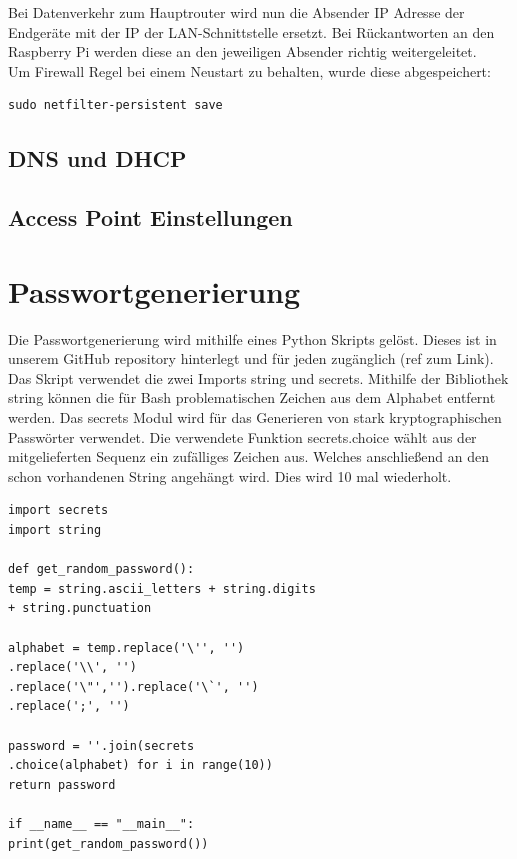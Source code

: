 \documentclass[a4paper,11pt,singlespacing]{article}
\begin{document}
                Bei Datenverkehr zum Hauptrouter wird nun die Absender IP Adresse der Endgeräte mit der IP der LAN-Schnittstelle ersetzt. Bei Rückantworten an den Raspberry Pi werden diese an den jeweiligen Absender richtig weitergeleitet.\\
            
                Um  Firewall Regel bei einem Neustart zu behalten, wurde diese abgespeichert:\\
                
            \begin{lstlisting}
sudo netfilter-persistent save
         \end{lstlisting}    
            \subsection{DNS und DHCP}
            \subsection{Access Point Einstellungen}
         
            
    	\section{Passwortgenerierung}
    		Die Passwortgenerierung wird mithilfe eines Python Skripts gelöst. Dieses ist in unserem GitHub repository hinterlegt und für jeden zugänglich (ref zum Link). Das Skript verwendet die zwei Imports string und secrets. Mithilfe der Bibliothek string können die für Bash problematischen Zeichen aus dem Alphabet entfernt werden. Das secrets Modul wird für das Generieren von stark kryptographischen Passwörter verwendet. Die verwendete Funktion secrets.choice wählt aus der mitgelieferten Sequenz ein zufälliges Zeichen aus. Welches anschließend an den schon vorhandenen String angehängt wird. Dies wird 10 mal wiederholt.
    	
    	\lstset{
    			basicstyle=\ttfamily,
    			language=Python,
    		}
    	

            \begin{lstlisting}
import secrets
import string

def get_random_password():
temp = string.ascii_letters + string.digits 
+ string.punctuation

alphabet = temp.replace('\'', '')
.replace('\\', '')
.replace('\"','').replace('\`', '')
.replace(';', '')

password = ''.join(secrets
.choice(alphabet) for i in range(10))
return password

if __name__ == "__main__":
print(get_random_password())
            \end{lstlisting}
    	
\end{document}
